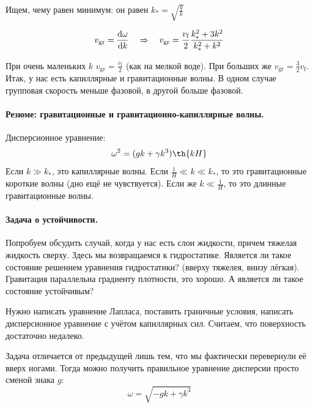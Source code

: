 Ищем, чему равен минимум: он равен $k_{*} = \sqrt{\frac{g}{k}}$

\begin{equation}
    v_\text{gr} = \dv{\omega}{k} \quad \Rightarrow \quad 
    v_\text{gr} = \frac{v_\text{f}}{2}\frac{k_{*}^2+3k^2}{k_{*}^2+k^2}
\end{equation}

При очень маленьких $k$ $v_\text{gr} = \frac{v_\text{f}}{2}$ (как на мелкой воде). 
При больших же $v_\text{gr} = \frac{3}{2}v_\text{f}$.
Итак, у нас есть капиллярные и гравитационные волны.
В одном случае групповая скорость меньше фазовой, в другой больше фазовой. 

\paragraph{Резюме: гравитационные и гравитационно-капиллярные волны.}
Дисперсионное уравнение:
\begin{equation}
    \omega^2 = (gk+\gamma k^3)\th{kH}
\end{equation}
Если $k \gg k_*$, это капиллярные волны. 
Если $\frac{1}{H} \ll k \ll k_*$, то это гравитационные короткие волны (дно ещё не чувствуется).
Если же $k \ll \frac{1}{H}$, то это длинные гравитационные волны.


\paragraph{Задача о устойчивости.} Попробуем обсудить случай, когда у нас есть слои жидкости, причем тяжелая жидкость сверху. 
Здесь мы возвращаемся к гидростатике.
Является ли такое состояние решением уравнения гидростатики? (вверху тяжелея, внизу лёгкая).
Гравитация параллельна градиенту плотности, это хорошо. 
А является ли такое состояние устойчивым? 

Нужно написать уравнение Лапласа, поставить граничные условия, написать дисперсионное уравнение с учётом капиллярных сил. 
Считаем, что поверхность достаточно недалеко.

Задача отличается от предыдущей лишь тем, что мы фактически перевернули её вверх ногами. Тогда можно получить правильное  уравнение дисперсии просто сменой знака $g$:
\begin{equation}
    \omega = \sqrt{-gk+\gamma k^3}
\end{equation}


